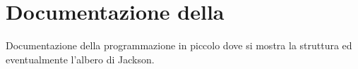 \chapter{Documentazione della}
\label{appendiceB}
\thispagestyle{empty}

\noindent Documentazione della programmazione in piccolo dove si mostra la struttura ed eventualmente l'albero di Jackson.